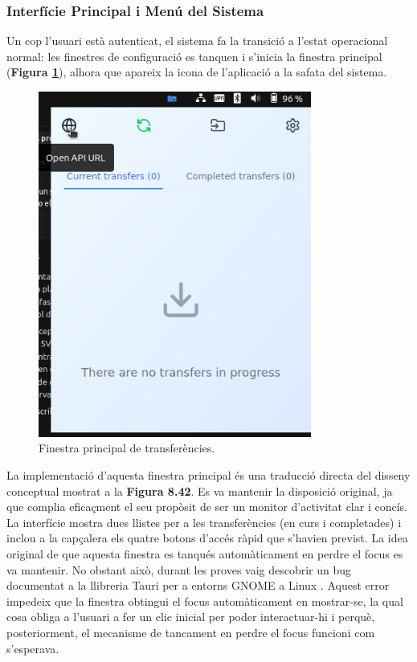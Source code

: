 \subsubsection{Interfície Principal i Menú del Sistema}
Un cop l'usuari està autenticat, el sistema fa la transició a l'estat operacional normal: les finestres de configuració es tanquen i s'inicia la finestra principal (\textbf{Figura \ref{fig:desktop-main-impl}}), alhora que apareix la icona de l'aplicació a la safata del sistema.

\begin{figure}[H]
    \centering
    \includegraphics[width=0.8\textwidth]{Figures/ui-desktop/main_window.png}
    \caption{Finestra principal de transferències.}
    \label{fig:desktop-main-impl}
\end{figure}

La implementació d'aquesta finestra principal és una traducció directa del disseny conceptual mostrat a la \textbf{Figura 8.42}. Es va mantenir la disposició original, ja que complia eficaçment el seu propòsit de ser un monitor d'activitat clar i concís. La interfície mostra dues llistes per a les transferències (en curs i completades) i inclou a la capçalera els quatre botons d'accés ràpid que s'havien previst. La idea original de que aquesta finestra es tanqués automàticament en perdre el focus es va mantenir. No obstant això, durant les proves vaig descobrir un bug documentat a la llibreria Tauri per a entorns GNOME a Linux \cite{tauri_focus_bug}. Aquest error impedeix que la finestra obtingui el focus automàticament en mostrar-se, la qual cosa obliga a l'usuari a fer un clic inicial per poder interactuar-hi i perquè, posteriorment, el mecanisme de tancament en perdre el focus funcioni com s'esperava.

